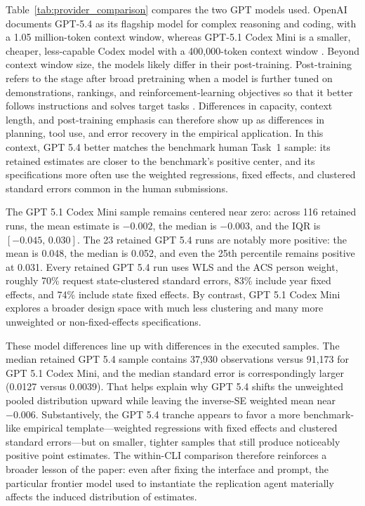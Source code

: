 \documentclass[12pt]{article}
\begin{document}
Table~\ref{tab:provider_comparison} compares the two GPT models used. OpenAI documents GPT-5.4 as its flagship model for complex reasoning and coding, with a 1.05 million-token context window, whereas GPT-5.1 Codex Mini is a smaller, cheaper, less-capable Codex model with a 400{,}000-token context window \citep{openai2026gpt54, openai2025gpt51codexmini}. Beyond context window size, the models likely differ in their post-training. Post-training refers to the stage after broad pretraining when a model is further tuned on demonstrations, rankings, and reinforcement-learning objectives so that it better follows instructions and solves target tasks \citep{ouyang2022instructgpt}. Differences in capacity, context length, and post-training emphasis can therefore show up as differences in planning, tool use, and error recovery in the empirical application. In this context, GPT 5.4 better matches the benchmark human Task~1 sample: its retained estimates are closer to the benchmark's positive center, and its specifications more often use the weighted regressions, fixed effects, and clustered standard errors common in the human submissions.

The GPT 5.1 Codex Mini sample remains centered near zero: across 116 retained runs, the mean estimate is $-0.002$, the median is $-0.003$, and the IQR is $[-0.045,\,0.030]$. The 23 retained GPT 5.4 runs are notably more positive: the mean is 0.048, the median is 0.052, and even the 25th percentile remains positive at 0.031. Every retained GPT 5.4 run uses WLS and the ACS person weight, roughly 70\% request state-clustered standard errors, 83\% include year fixed effects, and 74\% include state fixed effects. By contrast, GPT 5.1 Codex Mini explores a broader design space with much less clustering and many more unweighted or non-fixed-effects specifications.

These model differences line up with differences in the executed samples. The median retained GPT 5.4 sample contains 37{,}930 observations versus 91{,}173 for GPT 5.1 Codex Mini, and the median standard error is correspondingly larger (0.0127 versus 0.0039). That helps explain why GPT 5.4 shifts the unweighted pooled distribution upward while leaving the inverse-SE weighted mean near $-0.006$. Substantively, the GPT 5.4 tranche appears to favor a more benchmark-like empirical template---weighted regressions with fixed effects and clustered standard errors---but on smaller, tighter samples that still produce noticeably positive point estimates. The within-CLI comparison therefore reinforces a broader lesson of the paper: even after fixing the interface and prompt, the particular frontier model used to instantiate the replication agent materially affects the induced distribution of estimates.
\end{document}
